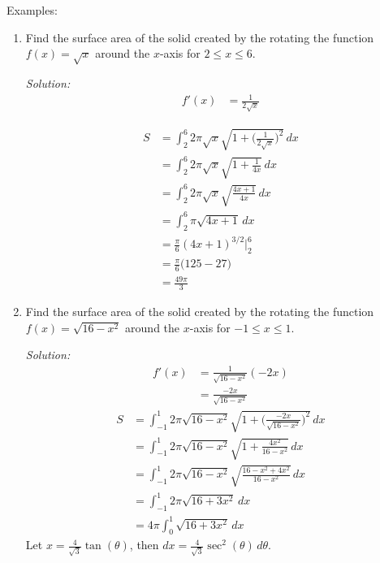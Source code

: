 \documentclass[16pt]{article}
\theoremstyle{remark}
\begin{document}
Examples:
\begin{enumerate}
\item Find the surface area of the solid created by the rotating the function $f(x) = \sqrt{x}$ around the $x$-axis for $2 \leq x \leq 6$.
\begin{mdframed}[style=TheoremFrame]
\textit{Solution:}
\begin{align*}
f'(x) &= \frac{1}{2\sqrt{x}}
\end{align*}

\begin{align*}
S&= \int_2^6 2\pi \sqrt{x} \sqrt{1 + \bigg(\frac{1}{2\sqrt{x}}\bigg)^2} \, dx\\[1.5ex]
&= \int_2^6 2\pi \sqrt{x} \sqrt{1 + \frac{1}{4x}} \, dx\\[1.5ex]
&= \int_2^6 2\pi \sqrt{x} \sqrt{\frac{4x+1}{4x}} \, dx\\[1.5ex]
&= \int_2^6 \pi \sqrt{4x+1} \, dx\\[1.5ex]
&= \frac{\pi}{6} (4x+1)^{3/2} \bigg|_2^6\\[1.5ex]
&= \frac{\pi}{6}\bigg(125-27)\\[1.5ex]
&= \frac{49\pi}{3} 
\end{align*}
\end{mdframed}
\newpage
\item Find the surface area of the solid created by the rotating the function $f(x) = \sqrt{16-x^2}$ around the $x$-axis for $-1 \leq x \leq 1$.
\begin{mdframed}[style=TheoremFrame]
\textit{Solution:}
\begin{align*}
f'(x) &= \frac{1}{\sqrt{16-x^2}}(-2x)\\[1.1ex]
&= \frac{-2x}{\sqrt{16-x^2}}
\end{align*}
\vspace*{-0.5cm}
\begin{align*}
S&= \int_{-1}^1 2\pi \sqrt{16-x^2} \sqrt{1+\bigg(\frac{-2x}{\sqrt{16-x^2}}\bigg)^2}\, dx\\[1.1ex]
&= \int_{-1}^1 2\pi \sqrt{16-x^2} \sqrt{1+\frac{4x^2}{16-x^2}}\, dx\\[1.1ex]
&= \int_{-1}^1 2\pi \sqrt{16-x^2} \sqrt{\frac{16-x^2+4x^2}{16-x^2}}\, dx\\[1.1ex]
&= \int_{-1}^1 2\pi \sqrt{16+3x^2}\, dx\\[1.1ex]
&= 4\pi \int_0^1 \sqrt{16+3x^2}\, dx
\end{align*}
Let $\displaystyle{x=\frac{4}{\sqrt{3}} \tan(\theta)}$, then $\displaystyle{dx = \frac{4}{\sqrt{3}} \sec^2(\theta)\,d\theta}$.

\end{mdframed}
\end{enumerate}
\end{document}
